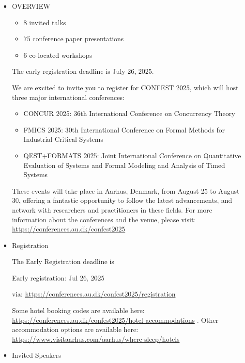 \documentclass[prodmode,acmtecs]{acmsmall} %
\begin{document}
{\begin{itemize}\item  OVERVIEW 
 
\begin{itemize}\item  8 invited talks
\item  75 conference paper presentations
\item  6 co-located workshops
\end{itemize} 
  The early registration deadline is July 26, 2025. 
 
  We are excited to invite you to register for CONFEST 2025, which will host three major international conferences: 
 
\begin{itemize}\item  CONCUR 2025: 36th International Conference on Concurrency Theory
\item  FMICS 2025: 30th International Conference on Formal Methods for Industrial Critical Systems
\item  QEST+FORMATS 2025: Joint International Conference on Quantitative Evaluation of Systems and Formal Modeling and Analysis of Timed Systems
\end{itemize} 
  These events will take place in Aarhus, Denmark, from August 25 to August 30, offering a fantastic opportunity to follow the latest advancements, and network with researchers and practitioners in these fields. For more information about the conferences and the venue, please visit: \href{https://conferences.au.dk/confest2025}{https://conferences.au.dk/confest2025} 
 
\item  Registration 
 
  The Early Registration deadline is  
 
Early registration: Jul 26, 2025 
 
  via: \href{https://conferences.au.dk/confest2025/registration}{https://conferences.au.dk/confest2025/registration} 
 
  Some hotel booking codes are available here: \href{https://conferences.au.dk/confest2025/hotel-accommodations}{https://conferences.au.dk/confest2025/hotel-accommodations} . Other accommodation options are available here: \href{https://www.visitaarhus.com/aarhus/where-sleep/hotels}{https://www.visitaarhus.com/aarhus/where-sleep/hotels} 
 
\item  Invited Speakers 
 

\end{itemize}}
\end{document}
